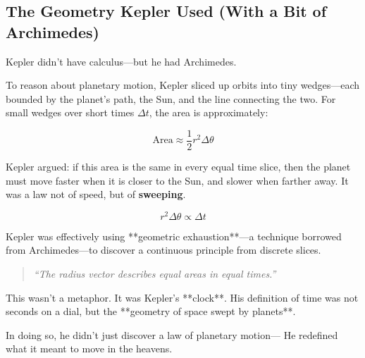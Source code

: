 \subsection{The Geometry Kepler Used (With a Bit of Archimedes)}

Kepler didn’t have calculus—but he had Archimedes.

To reason about planetary motion, Kepler sliced up orbits into tiny wedges—each bounded by the planet’s path, the Sun, and the line connecting the two. For small wedges over short times \( \Delta t \), the area is approximately:

\[
\text{Area} \approx \frac{1}{2} r^2 \Delta\theta
\]

Kepler argued: if this area is the same in every equal time slice, then the planet must move faster when it is closer to the Sun, and slower when farther away. It was a law not of speed, but of \textbf{sweeping}.

\[
r^2 \Delta\theta \propto \Delta t
\]

Kepler was effectively using **geometric exhaustion**—a technique borrowed from Archimedes—to discover a continuous principle from discrete slices.

\begin{quote}
\textit{“The radius vector describes equal areas in equal times.”}
\end{quote}

This wasn’t a metaphor. It was Kepler’s **clock**. His definition of time was not seconds on a dial, but the **geometry of space swept by planets**.

In doing so, he didn’t just discover a law of planetary motion—  
He redefined what it meant to move in the heavens.
